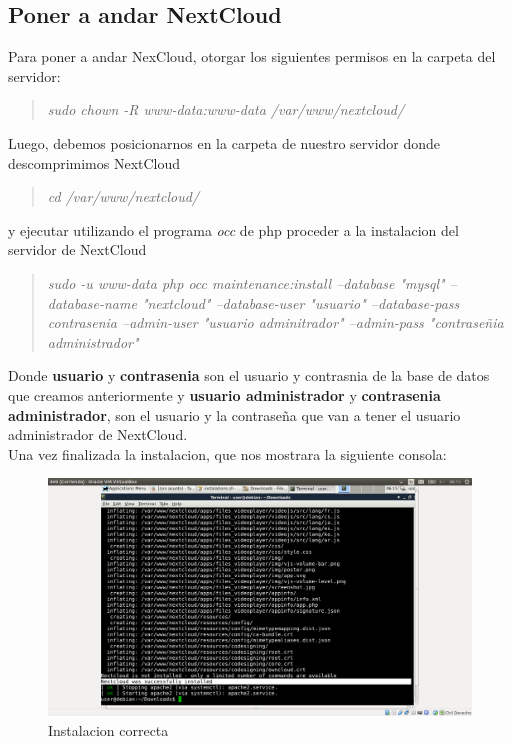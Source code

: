 \documentclass[11pt]{article}
\begin{document}
\subsection{Poner a andar NextCloud}
Para poner a andar NexCloud, otorgar los siguientes permisos en la carpeta del servidor:

\begin{quote}
\emph{ 
sudo chown -R www-data:www-data /var/www/nextcloud/ 
}
\end{quote}

Luego, debemos posicionarnos en la carpeta de nuestro servidor donde descomprimimos NextCloud

\begin{quote}
\emph{cd /var/www/nextcloud/}
\end{quote}

y ejecutar utilizando el programa \emph{occ} de php proceder a la instalacion del servidor de NextCloud 

\begin{quote}
\emph{sudo -u www-data php occ  maintenance:install --database "mysql" --database-name "nextcloud"  --database-user "usuario" --database-pass contrasenia --admin-user "usuario adminitrador" --admin-pass "contraseñia administrador"}
\end{quote}

Donde \textbf{usuario} y \textbf{contrasenia} son el usuario y contrasnia de la base de datos que creamos anteriormente y \textbf{usuario administrador} y \textbf{contrasenia administrador}, son el usuario y la contraseña que van a tener el usuario administrador de NextCloud.\\

Una vez finalizada la instalacion, que nos mostrara la siguiente consola:\\
\begin{figure}[htp]
\centering
\includegraphics[scale=0.20]{isntalacionCorrecta.png}
\caption{Instalacion correcta}
\label{}
\end{figure}\\
\end{document}
